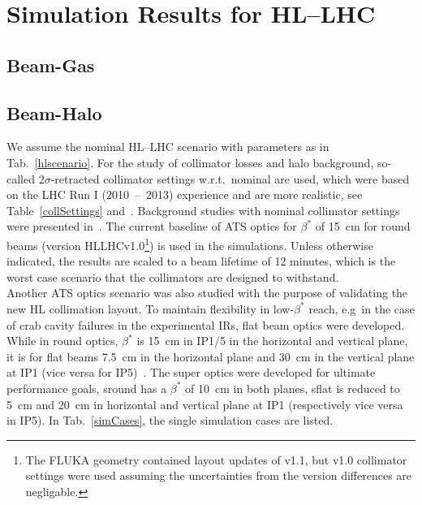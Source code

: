 \section{Simulation Results for HL--LHC\label{hllhcResults}}



\subsection{Beam-Gas}
\subsection{Beam-Halo }

We assume the nominal HL--LHC scenario with parameters as in Tab.~\ref{hlscenario}. For the study of collimator losses and halo background, so-called 2$\sigma$-retracted collimator settings w.r.t.~nominal are used, which were based on the LHC Run I (2010~--~2013) experience and are more realistic, see Table~\ref{collSettings} and~\cite{collSettRef}. Background studies with nominal collimator settings were presented in~\cite{lastyear}. The current baseline of ATS optics for $\beta^{*}$ of 15~cm for round beams (version HLLHCv1.0\footnote{The FLUKA geometry contained layout updates of v1.1, but v1.0 collimator settings were used assuming the uncertainties from the version differences are negligable.}) is used in the simulations.  Unless otherwise indicated, the results are scaled to a beam lifetime of 12 minutes, which is the worst case scenario that the collimators are 
designed to withstand.\\
Another ATS optics scenario was also studied with the purpose of validating the new HL collimation layout. To maintain flexibility in low-$\beta^*$ reach, e.g~in the case of crab cavity failures in the experimental IRs, flat beam optics were developed. While in round optics, $\beta^*$ is 15~cm in IP1/5 in the horizontal and vertical plane, it is for flat beams 7.5~cm in the horizontal plane and 30~cm in the vertical plane at IP1 (vice versa for IP5)~\cite{opticsWebRef}. The super optics were developed for ultimate performance goals, sround has a $\beta^*$ of 10~cm in both planes, sflat is reduced to 5~cm and 20~cm in horizontal and vertical plane at IP1 (respectively vice versa in IP5). In Tab.~\ref{simCases}, the single simulation cases are listed.


